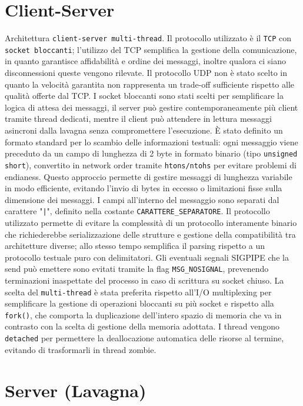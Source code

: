 \documentclass[a4paper,11pt]{article}
\begin{document}
\section*{Client-Server}
Architettura \texttt{client-server multi-thread}. Il protocollo utilizzato è il \texttt{TCP} con \texttt{socket bloccanti}; 
l'utilizzo del TCP semplifica la gestione della comunicazione, in quanto garantisce affidabilità e ordine dei messaggi, inoltre qualora ci siano disconnessioni queste vengono rilevate.
Il protocollo UDP non è stato scelto in quanto la velocità garantita non rappresenta un trade-off sufficiente rispetto alle qualità offerte dal TCP. 
I socket bloccanti sono stati scelti per semplificare la logica di attesa dei messaggi, il server può gestire contemporaneamente 
più client tramite thread dedicati, mentre il client può attendere in lettura messaggi asincroni dalla lavagna senza compromettere l'esecuzione. 
È stato definito un formato standard per lo scambio delle informazioni testuali: ogni messaggio viene preceduto da un campo di lunghezza di 2 
byte in formato binario (tipo \texttt{unsigned short}), convertito in network order tramite \texttt{htons/ntohs} per evitare problemi di endianess.
Questo approccio permette di gestire messaggi di lunghezza variabile in modo efficiente, evitando l'invio di bytes in eccesso o limitazioni fisse sulla dimensione dei messaggi. 
I campi all'interno del messaggio sono separati dal carattere "\texttt{|}", definito nella costante \texttt{CARATTERE\_SEPARATORE}. 
Il protocollo utilizzato permette di evitare la complessità di un protocollo interamente binario che richiederebbe serializzazione 
delle strutture e gestione della compatibilità tra architetture diverse; allo stesso tempo semplifica il parsing rispetto a un protocollo testuale puro con delimitatori.
Gli eventuali segnali SIGPIPE che la send può emettere sono evitati tramite la flag \texttt{MSG\_NOSIGNAL}, prevenendo terminazioni inaspettate del 
processo in caso di scrittura su socket chiuso.  
La scelta del \texttt{multi-thread} è stata preferita rispetto all'I/O multiplexing per semplificare la gestione di operazioni bloccanti su più socket e rispetto alla \texttt{fork()}, 
che comporta la duplicazione dell'intero spazio di memoria che va in contrasto con la scelta di gestione della memoria adottata. 
I thread vengono \texttt{detached} per permettere la deallocazione automatica delle risorse al termine, evitando di trasformarli in thread zombie.


\section*{Server (Lavagna)}
\end{document}
